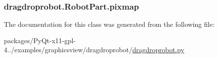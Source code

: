 \subsubsection[{pixmap}]{\setlength{\rightskip}{0pt plus 5cm}dragdroprobot.\+Robot\+Part.\+pixmap}\label{classdragdroprobot_1_1RobotPart_a8f56d6b0d7cd1750995b55bd862728e1}


The documentation for this class was generated from the following file\+:\begin{DoxyCompactItemize}
\item 
packages/\+Py\+Qt-\/x11-\/gpl-\/4../examples/graphicsview/dragdroprobot/\hyperlink{dragdroprobot_8py}{dragdroprobot.\+py}\end{DoxyCompactItemize}
